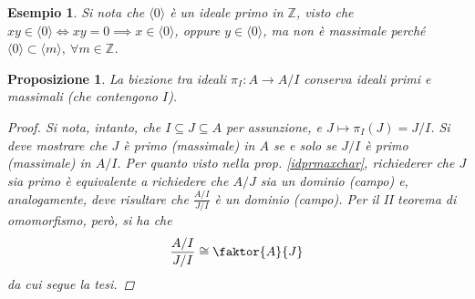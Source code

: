 \documentclass[12pt]{scrartcl}
\theoremstyle{style}
\newtheorem{esempio}{Esempio}[section]
\newtheorem{prop}{Proposizione}[section]
\numberwithin{equation}{subsection}
\begin{document}
\begin{esempio}
Si nota che $\langle 0 \rangle $ \`e un ideale primo in $\mathbb{Z}$, visto che $xy \in \langle 0 \rangle \iff xy = 0\implies x \in \langle 0 \rangle$, oppure $y \in \langle 0 \rangle$, ma non \`e massimale perch\'e $\langle 0 \rangle\subset \langle m \rangle  , \ \forall m \in \mathbb{Z}$.
\end{esempio}
\begin{prop}
	La biezione tra ideali $\pi_I : A \to A/I$ conserva ideali primi e massimali (che contengono $I$).
	\begin{proof}
		Si nota, intanto, che $I \subseteq J \subseteq A$ per assunzione, e $J\longmapsto \pi_I(J) = J / I$.
		Si deve mostrare che $J$ \`e primo (massimale) in $A$ se e solo se $J / I$ \`e primo (massimale) in $A / I$.
		Per quanto visto nella prop. \ref{idprmaxchar}, richiederer che $J $ sia primo \`e equivalente a richiedere che $A / J$ sia un dominio (campo) e, analogamente, deve risultare che $\frac{A / I}{J / I}$ \`e un dominio (campo).
		Per il II teorema di omomorfismo, per\`o, si ha che
		\[
			\frac{A / I }{J / I}\cong \faktor{A}{J}
		\] 
		da cui segue la tesi.
	\end{proof}
\end{prop}
\end{document}
